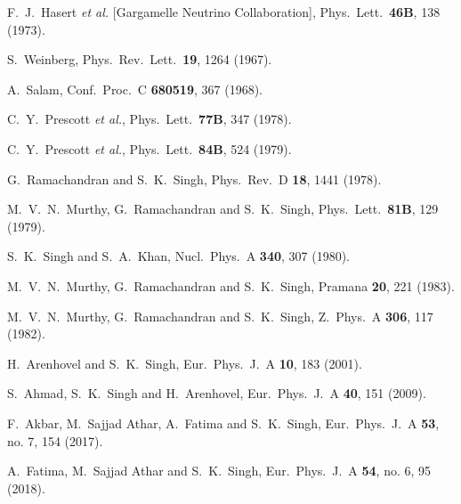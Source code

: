 \begin{thebibliography}{00}
  F.~J.~Hasert {\it et al.} [Gargamelle Neutrino Collaboration],
    Phys.\ Lett.\  {\bf 46B}, 138 (1973).
  
  

  S.~Weinberg,
    Phys.\ Rev.\ Lett.\  {\bf 19}, 1264 (1967).
  
  

  A.~Salam,
    Conf.\ Proc.\ C {\bf 680519}, 367 (1968).
  

  C.~Y.~Prescott {\it et al.},
    Phys.\ Lett.\  {\bf 77B}, 347 (1978).
  
  

  C.~Y.~Prescott {\it et al.},
    Phys.\ Lett.\  {\bf 84B}, 524 (1979).
  
  

  G.~Ramachandran and S.~K.~Singh,
    Phys.\ Rev.\ D {\bf 18}, 1441 (1978).
  
  

  M.~V.~N.~Murthy, G.~Ramachandran and S.~K.~Singh,
    Phys.\ Lett.\  {\bf 81B}, 129 (1979).
  
  

  S.~K.~Singh and S.~A.~Khan,
    Nucl.\ Phys.\ A {\bf 340}, 307 (1980).
  
  

  M.~V.~N.~Murthy, G.~Ramachandran and S.~K.~Singh,
    Pramana {\bf 20}, 221 (1983).
  
  

  M.~V.~N.~Murthy, G.~Ramachandran and S.~K.~Singh,
    Z.\ Phys.\ A {\bf 306}, 117 (1982).
  
  

  H.~Arenhovel and S.~K.~Singh,
    Eur.\ Phys.\ J.\ A {\bf 10}, 183 (2001).
  
  
  

  S.~Ahmad, S.~K.~Singh and H.~Arenhovel,
    Eur.\ Phys.\ J.\ A {\bf 40}, 151 (2009).
  
  

  F.~Akbar, M.~Sajjad Athar, A.~Fatima and S.~K.~Singh,
    Eur.\ Phys.\ J.\ A {\bf 53}, no. 7, 154 (2017).
  
  
  

  A.~Fatima, M.~Sajjad Athar and S.~K.~Singh,
    Eur.\ Phys.\ J.\ A {\bf 54}, no. 6, 95 (2018).
  

\end{thebibliography}
